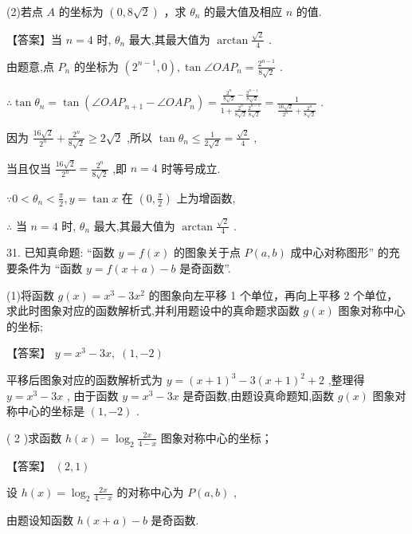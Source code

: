 \documentclass[10pt]{article}
\begin{document}
(2)若点 \(A\) 的坐标为 \(\left( {0,8\sqrt{2}}\right)\) ，求 \({\theta }_{n}\) 的最大值及相应 \(n\) 的值.

【答案】当 \(n = 4\) 时, \({\theta }_{n}\) 最大,其最大值为 \(\arctan \frac{\sqrt{2}}{4}\) .

由题意,点 \({P}_{n}\) 的坐标为 \(\left( {{2}^{n - 1},0}\right) ,\tan \angle {OA}{P}_{n} = \frac{{2}^{n - 1}}{8\sqrt{2}}\) .

\(\therefore \tan {\theta }_{n} = \tan \left( {\angle {OA}{P}_{n + 1} - \angle {OA}{P}_{n}}\right)  = \frac{\frac{{2}^{n}}{8\sqrt{2}} - \frac{{2}^{n - 1}}{8\sqrt{2}}}{1 + \frac{{2}^{n}}{8\sqrt{2}}\frac{{2}^{n - 1}}{8\sqrt{2}}} = \frac{1}{\frac{{16}\sqrt{2}}{{2}^{n}} + \frac{{2}^{n}}{8\sqrt{2}}}\) .

因为 \(\frac{{16}\sqrt{2}}{{2}^{n}} + \frac{{2}^{n}}{8\sqrt{2}} \geq  2\sqrt{2}\) ,所以 \(\tan {\theta }_{n} \leq  \frac{1}{2\sqrt{2}} = \frac{\sqrt{2}}{4}\) ,

当且仅当 \(\frac{{16}\sqrt{2}}{{2}^{n}} = \frac{{2}^{n}}{8\sqrt{2}}\) ,即 \(n = 4\) 时等号成立.

\(\because 0 < {\theta }_{n} < \frac{\pi }{2},y = \tan x\) 在 \(\left( {0,\frac{\pi }{2}}\right)\) 上为增函数,

\(\therefore\) 当 \(n = 4\) 时, \({\theta }_{n}\) 最大,其最大值为 \(\arctan \frac{\sqrt{2}}{4}\) .

31. 已知真命题: “函数 \(y = f\left( x\right)\) 的图象关于点 \(P\left( {a,b}\right)\) 成中心对称图形” 的充要条件为 “函数 \(y = f\left( {x + a}\right)  - b\) 是奇函数”.

(1)将函数 \(g\left( x\right)  = {x}^{3} - 3{x}^{2}\) 的图象向左平移 1 个单位，再向上平移 2 个单位，求此时图象对应的函数解析式,并利用题设中的真命题求函数 \(g\left( x\right)\) 图象对称中心的坐标;

【答案】 \(y = {x}^{3} - {3x},\;\left( {1, - 2}\right)\)

平移后图象对应的函数解析式为 \(y = {\left( x + 1\right) }^{3} - 3{\left( x + 1\right) }^{2} + 2\) ,整理得 \(y = {x}^{3} - {3x}\) , 由于函数 \(y = {x}^{3} - {3x}\) 是奇函数,由题设真命题知,函数 \(g\left( x\right)\) 图象对称中心的坐标是 \(\left( {1, - 2}\right)\) .

( 2 )求函数 \(h\left( x\right)  = {\log }_{2}\frac{2x}{4 - x}\) 图象对称中心的坐标；

【答案】 \(\left( {2,1}\right)\)

设 \(h\left( x\right)  = {\log }_{2}\frac{2x}{4 - x}\) 的对称中心为 \(P\left( {a,b}\right)\) ,

由题设知函数 \(h\left( {x + a}\right)  - b\) 是奇函数.
\end{document}
